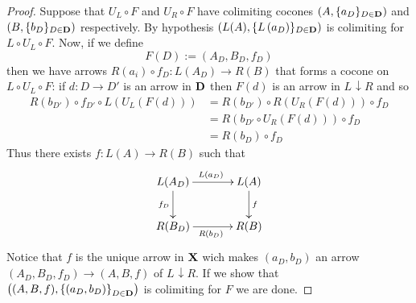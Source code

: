 \documentclass[a4paper,UKenglish,cleveref,pdftex,thm-restate,numberwithinsect]{lipics-v2021}
\def\B{\textbf {\textup{B}}}
\def\D{\textbf {\textup{D}}}
\def\X{\textbf {\textup{X}}}
\def\A{\textbf {\textup{A}}}
\newcommand{\comma}[2]{#1\hspace{1pt} {\downarrow}#2}
\begin{document}
\begin{proof}
	Suppose that $U_L\circ F$ and $U_R\circ F$ have colimiting cocones  $\left(A, \{a_D\}_{D\in \D}\right)$ and $\left(B, \{b_D\}_{D\in \D}\right)$ respectively. By hypothesis $\left(L(A), \{L\left(a_D\right)\}_{D\in \D}\right)$ is colimiting for $L\circ U_L\circ F$. Now, if we define
	\[F(D):=(A_D, B_D, f_D)\]
	then we have arrows $R(a_i)\circ f_D\colon L(A_D)\to R(B)$ that forms a cocone on $L\circ U_L\circ F$: if $d\colon D\to D'$ is an arrow in $\D$ then $F(d)$ is an arrow in $\comma{L}{R}$ and so
	\begin{align*}
		R\left(b_{D'}\right)\circ f_{D'}\circ L(U_L(F(d)))&=R\left(b_{D'}\right)\circ R\left(U_R\left(F(d)\right)\right)\circ f_D\\&=R\left(b_{D'}\circ U_R\left(F(d)\right)\right)\circ f_D\\&=R\left(b_D\right)\circ f_D
	\end{align*}
	Thus there exists $f\colon L(A)\rightarrow R(B)$ such that
	\[\xymatrix@C=35pt{ L(A_D) \ar[r]^{L(a_D)} \ar[d]_{f_D}& L(A) \ar[d]^{f}\\ R(B_D) \ar[r]_{R(b_D)} &R(B)}\]
	Notice that $f$ is the unique arrow in $\X$ wich makes $\left(a_D, b_D\right)$ an arrow $\left(A_D, B_D, f_D\right)\to \left(A, B, f\right)$ of $\comma{L}{R}$. If we show that $\left((A, B, f), \left\{(a_D, b_D)\right\}_{D\in \D}\right)$ is colimiting for $F$ we are done.
	

\end{proof}
\end{document}
